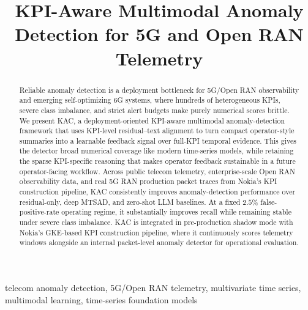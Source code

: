 \documentclass[conference]{IEEEtran}
\begin{document}
\title{KPI-Aware Multimodal Anomaly Detection for 5G and Open RAN Telemetry}

\author{
}

\maketitle

\begin{abstract}
Reliable anomaly detection is a deployment bottleneck for 5G/Open RAN observability and emerging self-optimizing 6G systems, where hundreds of heterogeneous KPIs, severe class imbalance, and strict alert budgets make purely numerical scores brittle.
We present KAC, a deployment-oriented KPI-aware multimodal anomaly-detection framework that uses KPI-level residual–text alignment to turn compact operator-style summaries into a learnable feedback signal over full-KPI temporal evidence.
This gives the detector broad numerical coverage like modern time-series models, while retaining the sparse KPI-specific reasoning that makes operator feedback sustainable in a future operator-facing workflow.
Across public telecom telemetry, enterprise-scale Open RAN observability data, and real 5G RAN production packet traces from Nokia's KPI construction pipeline, KAC consistently improves anomaly-detection performance over residual-only, deep MTSAD, and zero-shot LLM baselines.
At a fixed $2.5\%$ false-positive-rate operating regime, it substantially improves recall while remaining stable under severe class imbalance.
KAC is integrated in pre-production shadow mode with Nokia's GKE-based KPI construction pipeline, where it continuously scores telemetry windows alongside an internal packet-level anomaly detector for operational evaluation.
\end{abstract}

\begin{IEEEkeywords}
telecom anomaly detection,
5G/Open RAN telemetry,
multivariate time series,
multimodal learning,
time-series foundation models
\end{IEEEkeywords}
\end{document}
